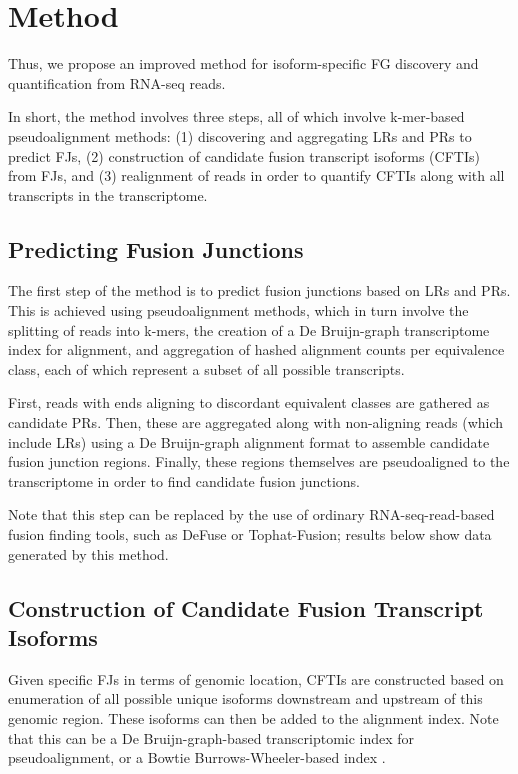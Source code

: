 \section{Method}

Thus, we propose an improved method for isoform-specific FG discovery and quantification from RNA-seq reads.

In short, the method involves three steps, all of which involve k-mer-based pseudoalignment methods: (1) discovering and aggregating LRs and PRs to predict FJs, (2) construction of candidate fusion transcript isoforms (CFTIs) from FJs, and (3) realignment of reads in order to quantify CFTIs along with all transcripts in the transcriptome.

\subsection{Predicting Fusion Junctions}

The first step of the method is to predict fusion junctions based on LRs and PRs. This is achieved using pseudoalignment methods, which in turn involve the splitting of reads into k-mers, the creation of a De Bruijn-graph transcriptome index for alignment, and aggregation of hashed alignment counts per equivalence class, each of which represent a subset of all possible transcripts.

First, reads with ends aligning to discordant equivalent classes are gathered as candidate PRs. Then, these are aggregated along with non-aligning reads (which include LRs) using a De Bruijn-graph alignment format to assemble candidate fusion junction regions. Finally, these regions themselves are pseudoaligned to the transcriptome in order to find candidate fusion junctions.

Note that this step can be replaced by the use of ordinary RNA-seq-read-based fusion finding tools, such as DeFuse\cite{mcpherson_defuse:_2011} or Tophat-Fusion\cite{kim_tophat-fusion:_2011}; results below show data generated by this method.

\subsection{Construction of Candidate Fusion Transcript Isoforms}

Given specific FJs in terms of genomic location, CFTIs are constructed based on enumeration of all possible unique isoforms downstream and upstream of this genomic region. These isoforms can then be added to the alignment index. Note that this can be a De Bruijn-graph-based transcriptomic index\cite{bray_near-optimal_2015} for pseudoalignment, or a Bowtie Burrows-Wheeler-based index \cite{langmead_fast_2012}.

